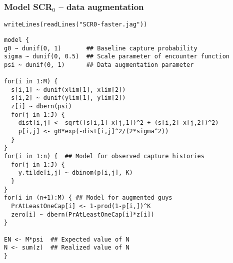 \documentclass[color=usenames,dvipsnames]{beamer}\usepackage[]{graphicx}\usepackage[]{xcolor}
\makeatletter
\newcommand{\hlsng}[1]{\textcolor[rgb]{0.749,0.012,0.012}{#1}}%
\newcommand{\hldef}[1]{\textcolor[rgb]{0,0,0}{#1}}%
\newcommand{\hlkwd}[1]{\textcolor[rgb]{0.004,0.004,0.506}{#1}}%
\newenvironment{kframe}{%
 \def\at@end@of@kframe{}%
 \ifinner\ifhmode%
  \def\at@end@of@kframe{\end{minipage}}%
  \begin{minipage}{\columnwidth}%
 \fi\fi%
 \def\FrameCommand##1{\hskip\@totalleftmargin \hskip-\fboxsep
 \colorbox{shadecolor}{##1}\hskip-\fboxsep
     \hskip-\linewidth \hskip-\@totalleftmargin \hskip\columnwidth}%
 \MakeFramed {\advance\hsize-\width
   \@totalleftmargin\z@ \linewidth\hsize
   \@setminipage}}%
 {\par\unskip\endMakeFramed%
 \at@end@of@kframe}
\newenvironment{knitrout}{}{} %
\makeatother
\begin{document}
\begin{frame}[fragile]
  \frametitle{Model SCR$_0$ -- data augmentation}
\vspace{-3pt}
\begin{knitrout}\tiny
{}\color{fgcolor}\begin{kframe}
\begin{alltt}
\hlkwd{writeLines}\hldef{(}\hlkwd{readLines}\hldef{(}\hlsng{"SCR0-faster.jag"}\hldef{))}
\end{alltt}
\end{kframe}
\end{knitrout}
\begin{knitrout}\tiny
{}\color{fgcolor}\begin{kframe}
\begin{verbatim}
model {
g0 ~ dunif(0, 1)       ## Baseline capture probability
sigma ~ dunif(0, 0.5)  ## Scale parameter of encounter function
psi ~ dunif(0, 1)      ## Data augmentation parameter

for(i in 1:M) {
  s[i,1] ~ dunif(xlim[1], xlim[2])
  s[i,2] ~ dunif(ylim[1], ylim[2])
  z[i] ~ dbern(psi)
  for(j in 1:J) {
    dist[i,j] <- sqrt((s[i,1]-x[j,1])^2 + (s[i,2]-x[j,2])^2)
    p[i,j] <- g0*exp(-dist[i,j]^2/(2*sigma^2))
  }
}
for(i in 1:n) {  ## Model for observed capture histories
  for(j in 1:J) {
    y.tilde[i,j] ~ dbinom(p[i,j], K)
  }
}
for(i in (n+1):M) { ## Model for augmented guys
  PrAtLeastOneCap[i] <- 1-prod(1-p[i,])^K
  zero[i] ~ dbern(PrAtLeastOneCap[i]*z[i])
}

EN <- M*psi  ## Expected value of N
N <- sum(z)  ## Realized value of N
}
\end{verbatim}
\end{kframe}
\end{knitrout}
\end{frame}
\end{document}
